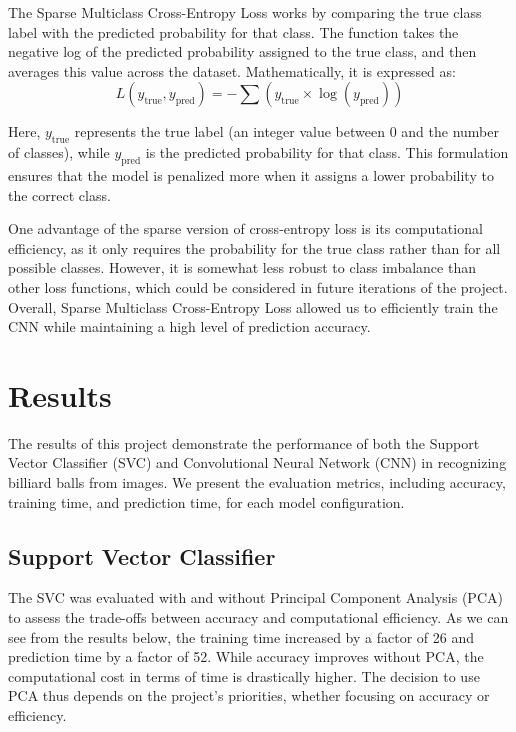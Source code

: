 \documentclass{article}
\begin{document}
The Sparse Multiclass Cross-Entropy Loss works by comparing the true class label with the predicted probability for that class. The function takes the negative log of the predicted probability assigned to the true class, and then averages this value across the dataset. Mathematically, it is expressed as:
\begin{equation}
    L(y_{\text{true}}, y_{\text{pred}}) = - \sum (y_{\text{true}} \times \log(y_{\text{pred}}))
\end{equation}

Here, $y_{\text{true}}$ represents the true label (an integer value between 0 and the number of classes), while $y_{\text{pred}}$ is the predicted probability for that class. This formulation ensures that the model is penalized more when it assigns a lower probability to the correct class\cite{jeevaLossFunctionsNeural2023}.

One advantage of the sparse version of cross-entropy loss is its computational efficiency, as it only requires the probability for the true class rather than for all possible classes. However, it is somewhat less robust to class imbalance than other loss functions, which could be considered in future iterations of the project. Overall, Sparse Multiclass Cross-Entropy Loss allowed us to efficiently train the CNN while maintaining a high level of prediction accuracy.

\section{Results}
\label{sec:results}
The results of this project demonstrate the performance of both the Support Vector Classifier (SVC) and Convolutional Neural Network (CNN) in recognizing billiard balls from images. We present the evaluation metrics, including accuracy, training time, and prediction time, for each model configuration.

\subsection*{Support Vector Classifier}

The SVC was evaluated with and without Principal Component Analysis (PCA) to assess the trade-offs between accuracy and computational efficiency. As we can see from the results below, the training time increased by a factor of 26 and prediction time by a factor of 52. While accuracy improves without PCA, the computational cost in terms of time is drastically higher. The decision to use PCA thus depends on the project's priorities, whether focusing on accuracy or efficiency.
\end{document}
